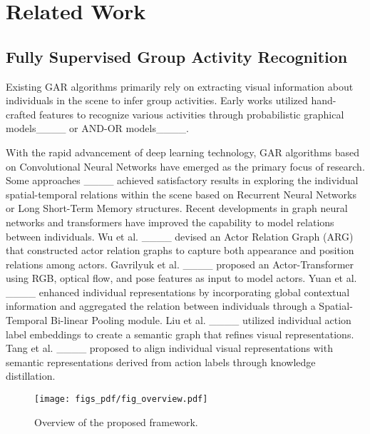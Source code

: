 \section{Related Work}
\label{sec:related}
\subsection{Fully Supervised Group Activity Recognition}
Existing GAR algorithms primarily rely on extracting visual information about individuals in the scene to infer group activities. 
Early works utilized hand-crafted features to recognize various activities through probabilistic graphical models____ or AND-OR models____.

With the rapid advancement of deep learning technology, GAR algorithms based on Convolutional Neural Networks have emerged as the primary focus of research.
Some approaches ____ achieved satisfactory results in exploring the individual spatial-temporal relations within the scene based on Recurrent Neural Networks or Long Short-Term Memory structures. 
Recent developments in graph neural networks and transformers have improved the capability to model relations between individuals. 
Wu et al. ____ devised an Actor Relation Graph (ARG) that constructed actor relation graphs to capture both appearance and position relations among actors.
Gavrilyuk et al. ____ proposed an Actor-Transformer using RGB, optical flow, and pose features as input to model actors. 
Yuan et al. ____ enhanced individual representations by incorporating global contextual information and aggregated the relation between individuals through a Spatial-Temporal Bi-linear Pooling module. 
Liu et al. ____ utilized individual action label embeddings to create a semantic graph that refines visual representations. 
Tang et al. ____ proposed to align individual visual representations with semantic representations derived from action labels through knowledge distillation. 

\begin{figure*}
    \centering
    \texttt{[image: figs\_pdf/fig\_overview.pdf]}
    \caption{Overview of the proposed framework. 
    } 
    \label{fig_overview}
\end{figure*} 

